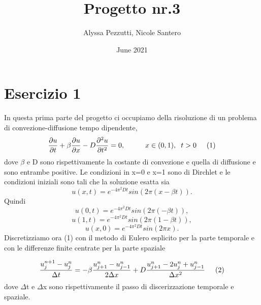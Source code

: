 \documentclass[]{article}
\title{Progetto nr.3}
\author{Alyssa Pezzutti, Nicole Santero}
\date{June 2021}
\begin{document}
\maketitle

\section{Esercizio 1}
In questa prima parte del progetto ci occupiamo della risoluzione di un problema di convezione-diffusione tempo dipendente,
$$\frac{\partial u}{\partial{t}}+\beta\frac{\partial u}{\partial{x}}-D\frac{\partial^{2} u}{\partial{t^{2}}}=0,\hspace{1cm}   x\in(0,1),\hspace{0.2cm} t>0\hspace{0.5cm}(1)$$\newline dove $\beta$ e D sono rispettivamente la costante di convezione e quella di diffusione e sono entrambe positive. Le condizioni in x=0 e x=1 sono di Dirchlet e le condizioni iniziali sono tali che la soluzione esatta sia $$u(x,t)=e^{-4\pi^{2}Dt}sin(2\pi(x-\beta t)).$$
Quindi $$u(0,t)=e^{-4\pi^{2}Dt}sin(2\pi(-\beta t)),$$ $$u(1,t)=e^{-4\pi^{2}Dt}sin(2\pi(1-\beta t)), $$  $$u(x,0)=e^{-4\pi^{2}Dt}sin(2\pi x).$$
Discretizziamo ora (1) con il metodo di Eulero esplicito per la parte temporale e con le differenze finite centrate per la parte spaziale

$$\frac{u^{n+1}_j-u^{n}_j}{\Delta t}=-\beta \frac{u^{n}_{j+1}-u^{n}_{j-1}}{2\Delta x}+D\frac{u^{n}_{j+1}-2u^{n}_{j}+u^{n}_{j-1}}{\Delta x^{2}}\hspace{0.5cm}(2)$$\newline
dove $\Delta$t e $\Delta$x sono rispettivamente il passo di discerizzazione temporale e spaziale.
\end{document}
